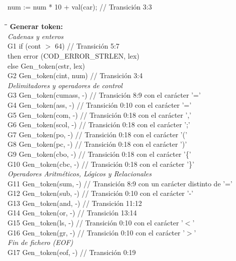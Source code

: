 \documentclass{article}
\begin{document}
\begin{tabbing}
    \> num := num * 10 + val(car); \> // Transición 3:3 \\
    \\
    \hspace{1cm}\=\hspace{1cm}\=\hspace{7cm}\=\kill %
    \textbf{Generar token:} \\
    \textit{Cadenas y enteros} \\
    \> G1 \> if (cont $>$ 64) \> // Transición 5:7 \\
    \> \hspace{1.5cm} then error (COD\_ERROR\_STRLEN, lex) \\
    \> \hspace{1cm}else Gen\_token(cstr, lex) \\
    \> G2 \> Gen\_token(cint, num) \> // Transición 3:4 \\
    \textit{Delimitadores y operadores de control} \\
    \> G3 \> Gen\_token(cumass, -) \> // Transición 8:9 con el carácter '='\\
    \> G4 \> Gen\_token(ass, -) \> // Transición 0:10 con el carácter '='\\
    \> G5 \> Gen\_token(com, -) \> // Transición 0:18 con el carácter ','\\
    \> G6 \> Gen\_token(scol, -) \> // Transición 0:18 con el carácter ';'\\
    \> G7 \> Gen\_token(po, -) \> // Transición 0:18 con el carácter '('\\
    \> G8 \> Gen\_token(pc, -) \> // Transición 0:18 con el carácter ')'\\
    \> G9 \> Gen\_token(cbo, -) \> // Transición 0:18 con el carácter '\{'\\
    \> G10 \> Gen\_token(cbc, -) \> // Transición 0:18 con el carácter '\}' \\
    \textit{Operadores Aritméticos, Lógicos y Relacionales} \\
    \> G11 \> Gen\_token(sum, -) \> // Transición 8:9 con un carácter distinto de '='\\
    \> G12 \> Gen\_token(sub, -) \> // Transición 0:10 con el carácter '-'\\
    \> G13 \> Gen\_token(and, -) \> // Transición 11:12 \\
    \> G14 \> Gen\_token(or, -) \> // Transición 13:14 \\
    \> G15 \> Gen\_token(ls, -) \> // Transición 0:10 con el carácter '$<$'\\
    \> G16 \> Gen\_token(gr, -) \> // Transición 0:10 con el carácter '$>$'\\
    \textit{Fin de fichero (EOF)} \\
    \> G17 \> Gen\_token(eof, -) \> // Transición 0:19 \\
\end{tabbing}
\end{document}
